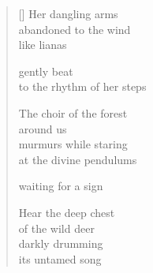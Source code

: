\documentclass[12pt,a4paper]{article}
\begin{document}
\thispagestyle{empty}

\poemtitle{}

\settowidth{\versewidth}{to the rhythm of her steps}

\bigskip

\begin{verse}[\versewidth]
  Her dangling arms \\
  abandoned to the wind \\
  like lianas

  gently beat \\
  to the rhythm of her steps

  The choir of the forest \\
  around us \\
  murmurs while staring \\
  at the divine pendulums

  waiting for a sign

  Hear the deep chest \\
  of the wild deer \\
  darkly drumming \\
  its untamed song
\end{verse}
\end{document}
